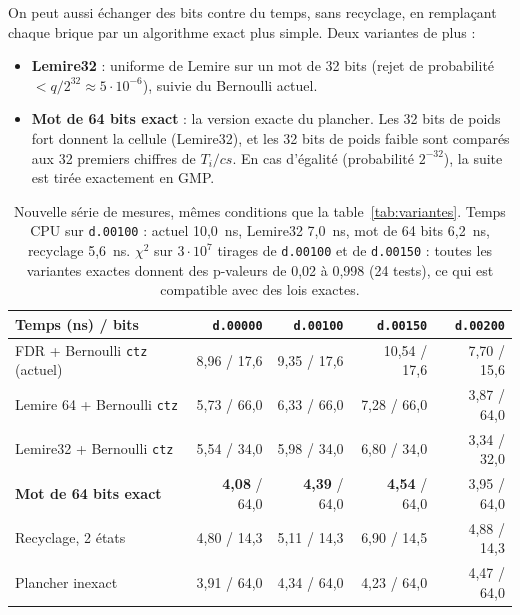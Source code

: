 \documentclass[11pt,a4paper]{article}
\newcommand{\code}[1]{\texttt{#1}}
\newcommand{\cs}{\mathit{cs}}
\begin{document}
On peut aussi échanger des bits contre du temps, sans recyclage, en remplaçant chaque
brique par un algorithme exact plus simple. Deux variantes de plus :
\begin{itemize}
\item \textbf{Lemire32} : uniforme de Lemire sur un mot de 32 bits (rejet de
  probabilité $< q/2^{32} \approx 5\cdot 10^{-6}$), suivie du Bernoulli actuel.
\item \textbf{Mot de 64 bits exact} : la version exacte du plancher. Les 32 bits de
  poids fort donnent la cellule (Lemire32), et les 32 bits de poids faible sont comparés
  aux 32 premiers chiffres de $T_i/\cs$. En cas d'égalité (probabilité $2^{-32}$), la
  suite est tirée exactement en GMP.
\end{itemize}

\begin{table}[H]
\centering
\small
\setlength{\tabcolsep}{4pt}
\begin{tabular}{lrrrr}
\toprule
Temps (ns) / bits & \code{d.00000} & \code{d.00100} & \code{d.00150} & \code{d.00200} \\
\midrule
FDR + Bernoulli \code{ctz} (actuel) & 8,96 / 17,6 & 9,35 / 17,6 & 10,54 / 17,6 & 7,70 / 15,6 \\
Lemire 64 + Bernoulli \code{ctz}    & 5,73 / 66,0 & 6,33 / 66,0 & 7,28 / 66,0 & 3,87 / 64,0 \\
Lemire32 + Bernoulli \code{ctz}     & 5,54 / 34,0 & 5,98 / 34,0 & 6,80 / 34,0 & 3,34 / 32,0 \\
\textbf{Mot de 64 bits exact}       & \textbf{4,08} / 64,0 & \textbf{4,39} / 64,0 & \textbf{4,54} / 64,0 & 3,95 / 64,0 \\
Recyclage, 2 états                  & 4,80 / 14,3 & 5,11 / 14,3 & 6,90 / 14,5 & 4,88 / 14,3 \\
Plancher inexact                    & 3,91 / 64,0 & 4,34 / 64,0 & 4,23 / 64,0 & 4,47 / 64,0 \\
\bottomrule
\end{tabular}
\caption{Nouvelle série de mesures, mêmes conditions que la table~\ref{tab:variantes}.
Temps CPU sur \code{d.00100} : actuel 10,0~ns, Lemire32 7,0~ns, mot de 64 bits
6,2~ns, recyclage 5,6~ns. $\chi^2$ sur $3\cdot 10^7$ tirages de \code{d.00100} et de
\code{d.00150} : toutes les variantes exactes donnent des p-valeurs de 0,02 à 0,998
(24 tests), ce qui est compatible avec des lois exactes.}
\end{table}
\end{document}
